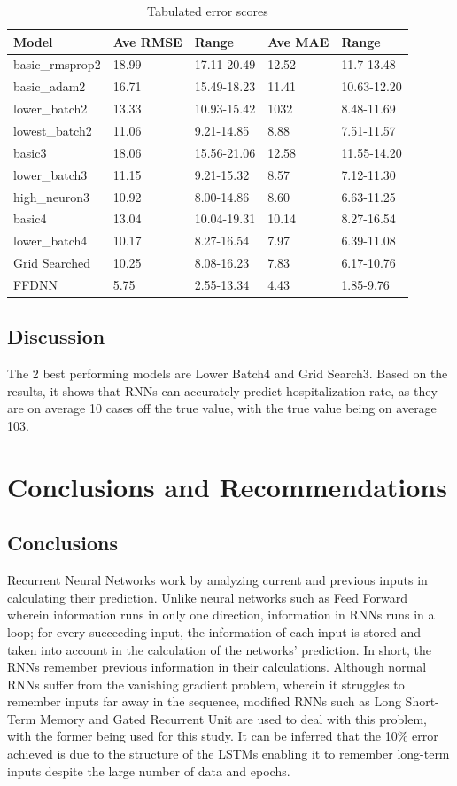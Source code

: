 \documentclass[10pt,11pt,12pt,oneside]{book}
\begin{document}
\begin{table}[H]
\centering
\begin{tabular}{|l|l|l|l|l|}
\toprule
Model & Ave RMSE & Range & Ave MAE & Range \\
\hline
basic\_rmsprop2  & 18.99 & 17.11-20.49 & 12.52 & 11.7-13.48 \\
\hline
basic\_adam2  & 16.71 & 15.49-18.23 & 11.41 & 10.63-12.20 \\
\hline
lower\_batch2 & 13.33 & 10.93-15.42 & 1032 & 8.48-11.69  \\
\hline
lowest\_batch2 & 11.06 & 9.21-14.85 & 8.88 & 7.51-11.57 \\
\hline
basic3 & 18.06 & 15.56-21.06 & 12.58 & 11.55-14.20 \\
\hline
lower\_batch3 & 11.15 & 9.21-15.32 & 8.57 & 7.12-11.30 \\
\hline
high\_neuron3 & 10.92 & 8.00-14.86 & 8.60 & 6.63-11.25 \\
\hline
basic4 & 13.04 & 10.04-19.31 & 10.14 & 8.27-16.54 \\
\hline
lower\_batch4 & 10.17 & 8.27-16.54 & 7.97 & 6.39-11.08 \\
\hline
Grid Searched & 10.25 & 8.08-16.23 & 7.83 & 6.17-10.76 \\
\hline
FFDNN & 5.75 & 2.55-13.34 & 4.43 & 1.85-9.76 \\
\bottomrule
\end{tabular}
\caption{Tabulated error scores}
\label{table:results}
\end{table}

\section{Discussion}
    The 2 best performing models are Lower Batch4 and Grid Search3. Based on the results, it shows that RNNs can accurately predict hospitalization rate, as they are on average 10 cases off the true value, with the true value being on average 103.
\chapter{Conclusions and Recommendations}
\section{Conclusions}
Recurrent Neural Networks work by analyzing current and previous inputs in calculating their prediction. Unlike neural networks such as Feed Forward wherein information runs in only one direction, information in RNNs runs in a loop; for every succeeding input, the information of each input is stored and taken into account in the calculation of the networks' prediction. In short, the RNNs remember previous information in their calculations. Although normal RNNs suffer from the vanishing gradient problem, wherein it struggles to remember inputs far away in the sequence, modified RNNs such as Long Short-Term Memory and Gated Recurrent Unit are used to deal with this problem, with the former being used for this study. It can be inferred that the 10\% error achieved is due to the structure of the LSTMs enabling it to remember long-term inputs despite the large number of data and epochs. 
\end{document}
